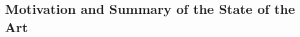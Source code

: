 \documentclass[robotics,article,submit,moreauthors,pdftex]{Definitions/mdpi}
\begin{document}

\subsection{Motivation and Summary of the State of the Art}
\end{document}

